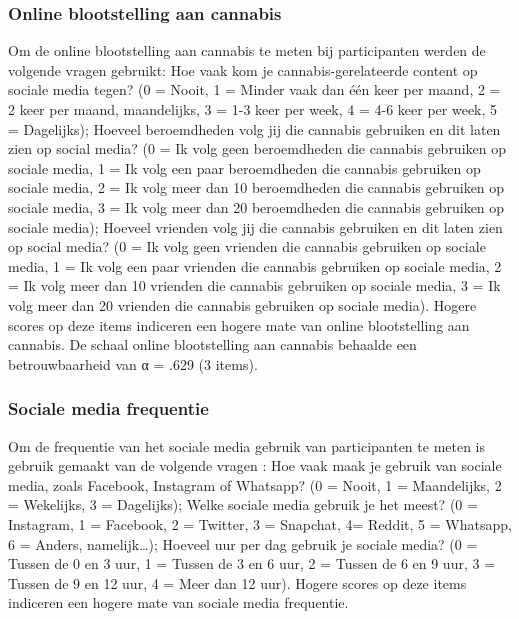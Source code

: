 \documentclass[
  letterpaper,
  DIV=11,
  numbers=noendperiod]{scrartcl}
\begin{document}
\hypertarget{online-blootstelling-aan-cannabis}{%
\subsubsection{Online blootstelling aan
cannabis}\label{online-blootstelling-aan-cannabis}}

Om de online blootstelling aan cannabis te meten bij participanten
werden de volgende vragen gebruikt: Hoe vaak kom je
cannabis-gerelateerde content op sociale media tegen? (0 = Nooit, 1 =
Minder vaak dan één keer per maand, 2 = 2 keer per maand, maandelijks, 3
= 1-3 keer per week, 4 = 4-6 keer per week, 5 = Dagelijks); Hoeveel
beroemdheden volg jij die cannabis gebruiken en dit laten zien op social
media? (0 = Ik volg geen beroemdheden die cannabis gebruiken op sociale
media, 1 = Ik volg een paar beroemdheden die cannabis gebruiken op
sociale media, 2 = Ik volg meer dan 10 beroemdheden die cannabis
gebruiken op sociale media, 3 = Ik volg meer dan 20 beroemdheden die
cannabis gebruiken op sociale media); Hoeveel vrienden volg jij die
cannabis gebruiken en dit laten zien op social media? (0 = Ik volg geen
vrienden die cannabis gebruiken op sociale media, 1 = Ik volg een paar
vrienden die cannabis gebruiken op sociale media, 2 = Ik volg meer dan
10 vrienden die cannabis gebruiken op sociale media, 3 = Ik volg meer
dan 20 vrienden die cannabis gebruiken op sociale media). Hogere scores
op deze items indiceren een hogere mate van online blootstelling aan
cannabis. De schaal online blootstelling aan cannabis behaalde een
betrouwbaarheid van α = .629 (3 items).

\hypertarget{sociale-media-frequentie}{%
\subsubsection{Sociale media
frequentie}\label{sociale-media-frequentie}}

Om de frequentie van het sociale media gebruik van participanten te
meten is gebruik gemaakt van de volgende vragen : Hoe vaak maak je
gebruik van sociale media, zoals Facebook, Instagram of Whatsapp? (0 =
Nooit, 1 = Maandelijks, 2 = Wekelijks, 3 = Dagelijks); Welke sociale
media gebruik je het meest? (0 = Instagram, 1 = Facebook, 2 = Twitter, 3
= Snapchat, 4= Reddit, 5 = Whatsapp, 6 = Anders, namelijk\ldots);
Hoeveel uur per dag gebruik je sociale media? (0 = Tussen de 0 en 3 uur,
1 = Tussen de 3 en 6 uur, 2 = Tussen de 6 en 9 uur, 3 = Tussen de 9 en
12 uur, 4 = Meer dan 12 uur). Hogere scores op deze items indiceren een
hogere mate van sociale media frequentie.
\end{document}
